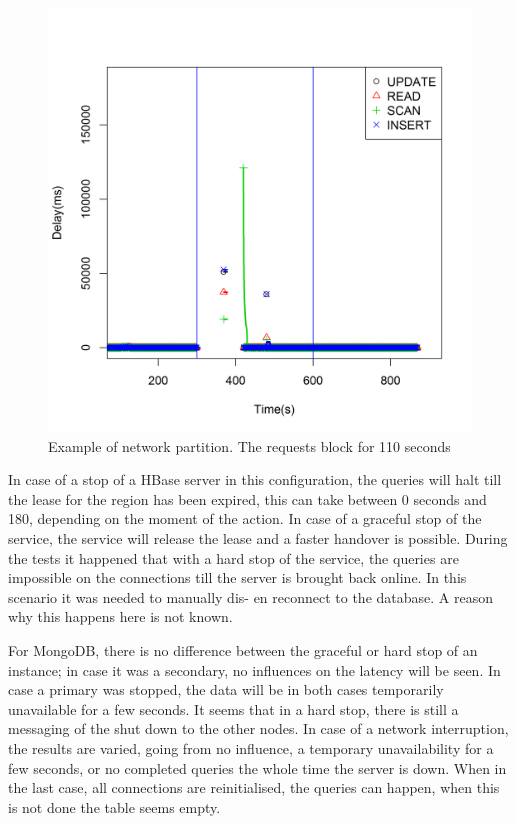 \documentclass[10pt,conference,letterpaper]{IEEEtran}
\begin{document}
\begin{figure}[ht]
\centering
\includegraphics[width=\linewidth]{img/HBase/single-graph-2-drop-1}
\caption{Example of network partition. The requests block for 110 seconds }
\end{figure}

In case of a stop of a HBase server in this configuration, the queries will halt till the lease for the region has been expired, this can take between 0 seconds and 180, depending on the moment of the action. In case of a graceful stop of the service, the service will release the lease and a faster handover is possible. During the tests it happened that with a hard stop of the service, the queries are impossible on the connections till the server is brought back online. In this scenario it was needed to manually dis- en reconnect to the database. A reason why this happens here is not known. 

For MongoDB, there is no difference between the graceful or hard stop of an instance; in case it was a secondary, no influences on the latency will be seen. In case a primary was stopped, the data will be in both cases temporarily unavailable for a few seconds. It seems that in a hard stop, there is still a messaging of the shut down to the other nodes. In case of a network interruption, the results are varied, going from no influence, a temporary unavailability for a few seconds, or no completed queries the whole time the server is down. When in the last case, all connections are reinitialised, the queries can happen, when this is not done the table seems empty. 
\end{document}

